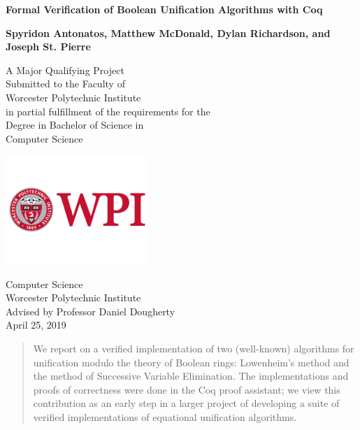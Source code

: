 
\begin{titlepage}
    \begin{center}
        \vspace*{1cm}
 
        \Huge
        \textbf{Formal Verification of Boolean Unification Algorithms with Coq}
 
        \vspace{1.5cm}
        
        \Large
        \textbf{Spyridon Antonatos, Matthew McDonald, Dylan Richardson, and Joseph St. Pierre}
 
        \vfill
 
        A Major Qualifying Project \\
        Submitted to the Faculty of \\
        Worcester Polytechnic Institute \\
        in partial fulfillment of the requirements for the \\
        Degree in Bachelor of Science in \\
        Computer Science
 
        \vspace{0.5cm}
 
        \includegraphics[width=0.4\textwidth]{logo}
 
        \Large
        Computer Science \\
        Worcester Polytechnic Institute \\
        Advised by Professor Daniel Dougherty \\
        April 25, 2019
 
    \end{center}
\end{titlepage}

\begin{abstract}
    We report on a verified implementation of two (well-known) algorithms for
    unification modulo the theory of Boolean rings: Lowenheim's method and the
    method of Successive Variable Elimination. The implementations and proofs of
    correctness were done in the Coq proof assistant; we view this contribution as
    an early step in a larger project of developing a suite of verified
    implementations of equational unification algorithms.
\end{abstract}
